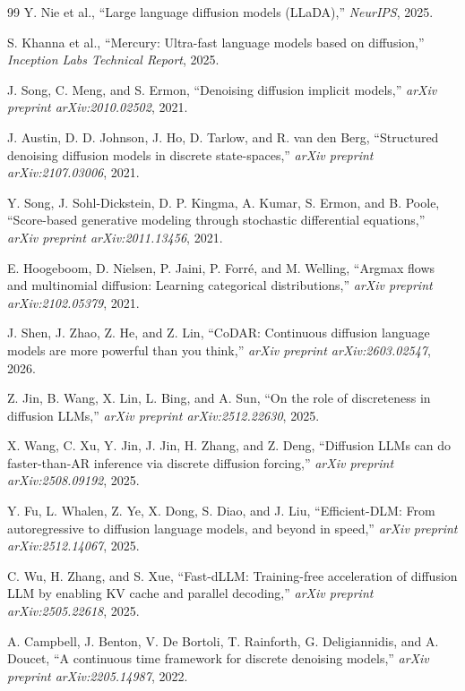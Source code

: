 \documentclass[11pt]{article}
\begin{document}
\begin{thebibliography}{99}
Y. Nie et al., ``Large language diffusion models (LLaDA),'' \textit{NeurIPS}, 2025.

S. Khanna et al., ``Mercury: Ultra-fast language models based on diffusion,'' \textit{Inception Labs Technical Report}, 2025.

J. Song, C. Meng, and S. Ermon, ``Denoising diffusion implicit models,'' \textit{arXiv preprint arXiv:2010.02502}, 2021.

J. Austin, D. D. Johnson, J. Ho, D. Tarlow, and R. van den Berg, ``Structured denoising diffusion models in discrete state-spaces,'' \textit{arXiv preprint arXiv:2107.03006}, 2021.

Y. Song, J. Sohl-Dickstein, D. P. Kingma, A. Kumar, S. Ermon, and B. Poole, ``Score-based generative modeling through stochastic differential equations,'' \textit{arXiv preprint arXiv:2011.13456}, 2021.

E. Hoogeboom, D. Nielsen, P. Jaini, P. Forr\'e, and M. Welling, ``Argmax flows and multinomial diffusion: Learning categorical distributions,'' \textit{arXiv preprint arXiv:2102.05379}, 2021.

J. Shen, J. Zhao, Z. He, and Z. Lin, ``CoDAR: Continuous diffusion language models are more powerful than you think,'' \textit{arXiv preprint arXiv:2603.02547}, 2026.

Z. Jin, B. Wang, X. Lin, L. Bing, and A. Sun, ``On the role of discreteness in diffusion LLMs,'' \textit{arXiv preprint arXiv:2512.22630}, 2025.

X. Wang, C. Xu, Y. Jin, J. Jin, H. Zhang, and Z. Deng, ``Diffusion LLMs can do faster-than-AR inference via discrete diffusion forcing,'' \textit{arXiv preprint arXiv:2508.09192}, 2025.

Y. Fu, L. Whalen, Z. Ye, X. Dong, S. Diao, and J. Liu, ``Efficient-DLM: From autoregressive to diffusion language models, and beyond in speed,'' \textit{arXiv preprint arXiv:2512.14067}, 2025.

C. Wu, H. Zhang, and S. Xue, ``Fast-dLLM: Training-free acceleration of diffusion LLM by enabling KV cache and parallel decoding,'' \textit{arXiv preprint arXiv:2505.22618}, 2025.

A. Campbell, J. Benton, V. De Bortoli, T. Rainforth, G. Deligiannidis, and A. Doucet, ``A continuous time framework for discrete denoising models,'' \textit{arXiv preprint arXiv:2205.14987}, 2022.


\end{thebibliography}
\end{document}
